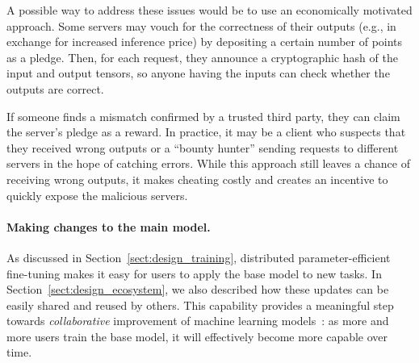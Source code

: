A possible way to address these issues would be to use an economically motivated approach.
Some servers may vouch for the correctness of their outputs (e.g., in exchange for increased inference price) by depositing a certain number of points as a pledge. Then, for each request, they announce a cryptographic hash of the input and output tensors, so anyone having the inputs can check whether the outputs are correct.

If someone finds a mismatch confirmed by a trusted third party, they can claim the server's pledge as a reward. In practice, it may be a client who suspects that they received wrong outputs or a ``bounty hunter'' sending requests to different servers in the hope of catching errors.
While this approach still leaves a chance of receiving wrong outputs, it makes cheating costly and creates an incentive to quickly expose the malicious servers.






\paragraph{Making changes to the main model.}
As discussed in Section~\ref{sect:design_training}, distributed parameter-efficient fine-tuning makes it easy for users to apply the base model to new tasks.
In Section~\ref{sect:design_ecosystem}, we also described how these updates can be easily shared and reused by others.
This capability provides a meaningful step towards \textit{collaborative} improvement of machine learning models~\citep{raffel2021call}:
as more and more users train the base model, it will effectively become more capable over time.

